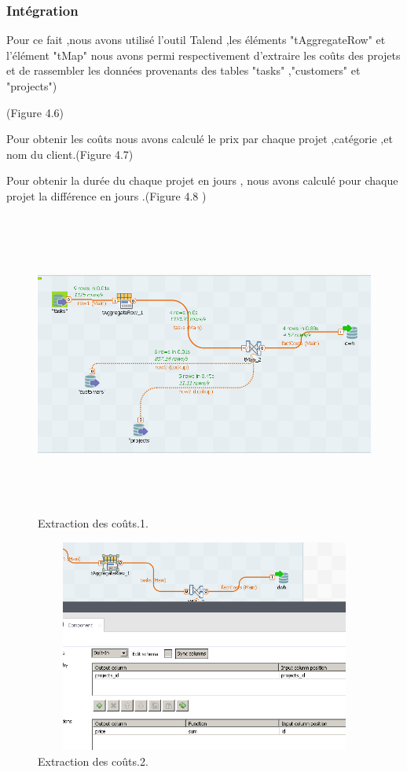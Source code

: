 \subsubsection{Int\'{e}gration}
Pour ce fait ,nous avons utilis\'{e}  l'outil Talend ,les \'{e}l\'{e}ments "tAggregateRow" et l'\'{e}l\'{e}ment "tMap" nous avons permi respectivement
d'extraire les coûts des projets et de rassembler les données provenants des tables "tasks" ,"customers" et "projects")


(Figure 4.6)


Pour obtenir les co\^{u}ts nous avons calcul\'{e} le prix par chaque projet
,cat\'{e}gorie ,et nom du client.(Figure  4.7)

Pour obtenir la dur\'{e}e du chaque projet en jours ,
nous avons calcul\'{e} pour chaque projet la diff\'{e}rence en jours .(Figure 4.8 )

\begin{figure}[H]
\center
\includegraphics[width=14cm,height=10cm]{./figures/integ.png}
\caption{Extraction des co\^{u}ts.1.}
\end{figure}



\begin{figure}[H]
\center
\includegraphics[width=12cm,height=7cm]{./figures/integ1.png}
\caption{Extraction des co\^{u}ts.2.}
\end{figure}







